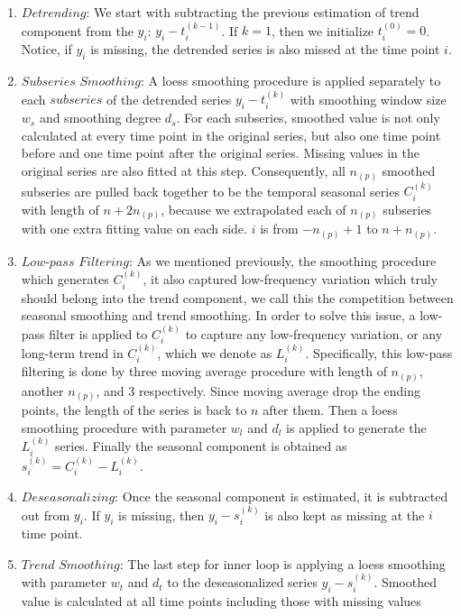 \begin{enumerate}
  \item $Detrending$:
  We start with subtracting the previous estimation of trend component from the
  $y_i$: $y_i - t_i^{(k-1)}$. If $k=1$, then we initialize $t_i^{(0)}=0$. Notice,
  if $y_i$ is missing, the detrended series is also missed at the time point $i$.
  \item $Subseries$ $Smoothing$:
  A loess smoothing procedure is applied separately to each $subseries$ of the 
  detrended series $y_i - t_i^{(k)}$ with smoothing window size $w_s$ and 
  smoothing degree $d_s$. For each subseries, smoothed value is not only 
  calculated at every time point in the original series, but also one time point
  before and one time point after the original series. Missing values in the 
  original series are also fitted at this step.
  Consequently, all $n_{(p)}$ smoothed subseries are pulled back together 
  to be the temporal seasonal series $C_i^{(k)}$ with length of $n + 2n_{(p)}$, 
  because we extrapolated each of $n_{(p)}$ subseries with one extra fitting 
  value on each side. $i$ is from $-n_{(p)} + 1$ to $n + n_{(p)}$.  
  \item $Low$-$pass$ $Filtering$:
  As we mentioned previously, the smoothing procedure which generates $C_i^{(k)}$, 
  it also captured low-frequency variation which truly should belong into 
  the trend component, we call this the competition between seasonal smoothing
  and trend smoothing. In order to solve this issue, a low-pass filter is applied 
  to $C_i^{(k)}$ to capture any low-frequency variation, or any long-term trend 
  in $C_i^{(k)}$, which we denote as $L_i^{(k)}$. Specifically, this low-pass 
  filtering is done by three moving average procedure with length of $n_{(p)}$, 
  another $n_{(p)}$, and 3 respectively. Since moving average drop the ending 
  points, the length of the series is back to $n$ after them. Then a loess 
  smoothing procedure with parameter $w_l$ and $d_l$ is applied to generate the 
  $L_i^{(k)}$ series. Finally the seasonal component is obtained as 
  $s_i^{(k)} = C_i^{(k)} - L_i^{(k)}$.  
  \item $Deseasonalizing$:
  Once the seasonal component is estimated, it is subtracted out from $y_i$. If
  $y_i$ is missing, then $y_i - s_i^{(k)}$ is also kept as missing at the $i$
  time point.
  \item $Trend$ $Smoothing$:
  The last step for inner loop is applying a loess smoothing with parameter $w_t$
  and $d_t$ to the deseasonalized series $y_i - s_i^{(k)}$. Smoothed value is 
  calculated at all time points including those with missing values 
\end{enumerate}

